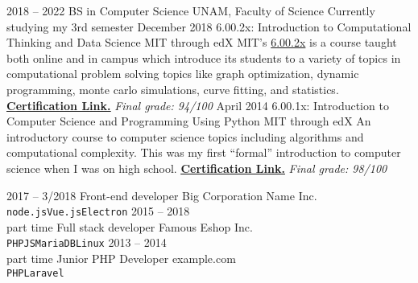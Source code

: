 \documentclass[9pt]{developercv}
\begin{document}
\begin{entrylist}
    \entry
        {2018 -- 2022}
        {BS in Computer Science}
        {UNAM, Faculty of Science}
        {Currently studying my 3rd semester}
    \entry
        {December 2018}
        {6.00.2x: Introduction to Computational Thinking and Data Science}
        {MIT through edX}
        {MIT's {\href{https://www.edx.org/course/introduction-to-computational-thinking-and-data-science-2}{6.00.2x}} is a course taught both online and in campus which introduce its students to a variety of topics in computational problem solving topics like graph optimization, dynamic programming, monte carlo simulations, curve fitting, and statistics. {\href{https://courses.edx.org/certificates/44a472b535354c15b494ac70b98af436}{\textbf{\underline{Certification Link.}}}} \textit{\small{Final grade: 94/100}}} 
    \entry
        {April 2014}
        {6.00.1x: Introduction to Computer Science and Programming Using Python}
        {MIT through edX}
        {An introductory course to computer science topics including algorithms and computational complexity. This was my first ``formal'' introduction to computer science when I was on high school. {\href{https://verify.edx.org/cert/7392793dde3e4537911d04e6ffc0b3f5}{\textbf{\underline{Certification Link.}}}} \textit{\small{Final grade: 98/100}}} 
\end{entrylist}





\begin{entrylist}
    \entry
        {2017 -- 3/2018}
        {Front-end developer}
        {Big Corporation Name Inc.}
        {\lorem \lorem \lorem\\ \texttt{node.js}\slashsep\texttt{Vue.js}\slashsep\texttt{Electron}}
    \entry
        {2015 -- 2018\\\footnotesize{part time}}
        {Full stack developer}
        {Famous Eshop Inc.}
        {\lorem\lorem\\ \texttt{PHP}\slashsep\texttt{JS}\slashsep\texttt{MariaDB}\slashsep\texttt{Linux}}
    \entry
        {2013 -- 2014\\\footnotesize{part time}}
        {Junior PHP Developer}
        {example.com}
        {\lorem\lorem\\ \texttt{PHP}\slashsep\texttt{Laravel}}
\end{entrylist}
\end{document}
